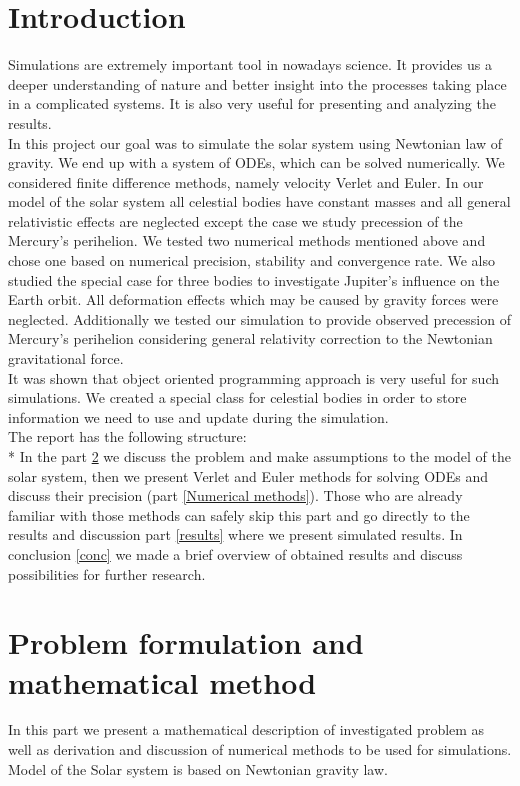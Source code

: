 \documentclass[10pt]{article}
\begin{document}
\section{Introduction}
Simulations are extremely important tool in nowadays science. It provides us a deeper understanding of nature and  better insight into the processes taking place in a complicated systems. It is also very useful for presenting and analyzing the results.\\
In this project our goal was to simulate the solar system using Newtonian law of gravity. We end up with a system of ODEs, which can be solved numerically. We considered finite difference methods, namely velocity Verlet and Euler. In our model of the solar system all celestial bodies have constant masses and all general relativistic effects are neglected except the case we study precession of the Mercury's perihelion. We tested two numerical methods mentioned above and chose one based on numerical precision, stability and convergence rate. We also studied the special case for three bodies to investigate Jupiter's influence on the Earth orbit. All deformation effects which may be caused by gravity forces were neglected. Additionally we tested our simulation to provide observed precession of Mercury's perihelion considering general relativity correction to the Newtonian gravitational force.\\
It was shown that object oriented programming approach is very useful for such simulations. We created a special class for celestial bodies in order to store information we need to use and update during the simulation. \\
The report has the following structure:\\*
In the part \ref{Part1}  we discuss the problem and make assumptions to the model of the solar system, then we present Verlet and Euler methods for solving ODEs and discuss their precision (part \ref{Numerical methods}). Those who are already familiar with those methods can safely skip this part and go directly to the results and discussion part \ref{results}  where we present simulated results. In conclusion \ref{conc} we made a brief overview of obtained results and discuss possibilities for further research. 

 

\newpage
\section{Problem formulation and mathematical method}\label{Part1}
In this part we present a mathematical description of investigated problem as well as derivation and discussion of numerical methods to be used for simulations.  Model of the Solar system is based on Newtonian gravity law. 
\end{document}
